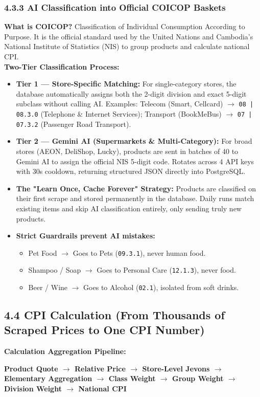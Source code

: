 \documentclass[10pt,a4paper]{article}
\begin{document}
\subsubsection*{4.3.3 AI Classification into Official COICOP Baskets}
\noindent
\textbf{What is COICOP?} Classification of Individual Consumption According to Purpose. It is the official standard used by the United Nations and Cambodia's National Institute of Statistics (NIS) to group products and calculate national CPI.\\[0.1cm]
\noindent\textbf{Two-Tier Classification Process:}
\begin{itemize}[noitemsep,topsep=1pt,leftmargin=*]
    \item \textbf{Tier 1 --- Store-Specific Matching:} For single-category stores, the database automatically assigns both the 2-digit division and exact 5-digit subclass without calling AI. Examples: Telecom (Smart, Cellcard) $\longrightarrow$ \texttt{08 | 08.3.0} (Telephone \& Internet Services); Transport (BookMeBus) $\longrightarrow$ \texttt{07 | 07.3.2} (Passenger Road Transport).
    \item \textbf{Tier 2 --- Gemini AI (Supermarkets \& Multi-Category):} For broad stores (AEON, DeliShop, Lucky), products are sent in batches of 40 to Gemini AI to assign the official NIS 5-digit code. Rotates across 4 API keys with 30s cooldown, returning structured JSON directly into PostgreSQL.
    \item \textbf{The "Learn Once, Cache Forever" Strategy:} Products are classified on their first scrape and stored permanently in the database. Daily runs match existing items and skip AI classification entirely, only sending truly new products.
    \item \textbf{Strict Guardrails prevent AI mistakes:}
    \begin{itemize}[noitemsep]
        \item Pet Food $\longrightarrow$ Goes to Pets (\texttt{09.3.1}), never human food.
        \item Shampoo / Soap $\longrightarrow$ Goes to Personal Care (\texttt{12.1.3}), never food.
        \item Beer / Wine $\longrightarrow$ Goes to Alcohol (\texttt{02.1}), isolated from soft drinks.
    \end{itemize}
\end{itemize}

\subsection*{4.4 CPI Calculation (From Thousands of Scraped Prices to One CPI Number)}
\noindent
\textbf{Calculation Aggregation Pipeline:}
\begin{center}
    \textbf{Product Quote $\longrightarrow$ Relative Price $\longrightarrow$ Store-Level Jevons $\longrightarrow$ Elementary Aggregation $\longrightarrow$ Class Weight $\longrightarrow$ Group Weight $\longrightarrow$ Division Weight $\longrightarrow$ National CPI}
\end{center}
\end{document}
